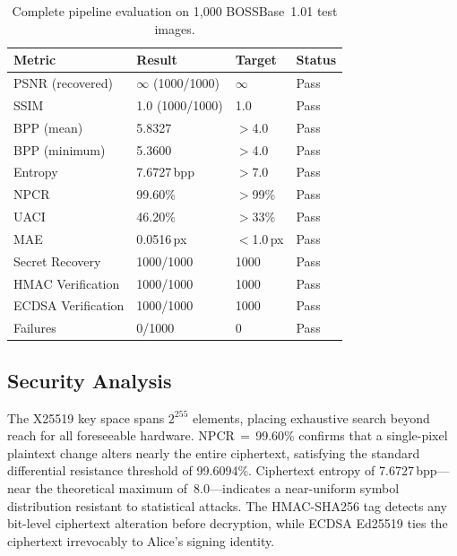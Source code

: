 \documentclass[runningheads]{llncs}
\begin{document}
\begin{table}[t]
\centering
\caption{Complete pipeline evaluation on 1,000 BOSSBase~1.01
test images.}
\label{tab:results}
\begin{tabular}{@{}llll@{}}
\toprule
\textbf{Metric} & \textbf{Result} & \textbf{Target} & \textbf{Status}\\
\midrule
PSNR (recovered)   & $\infty$ (1000/1000)  & $\infty$   & Pass\\
SSIM               & 1.0 (1000/1000)       & 1.0        & Pass\\
BPP (mean)         & 5.8327                & $>$4.0     & Pass\\
BPP (minimum)      & 5.3600                & $>$4.0     & Pass\\
Entropy            & 7.6727\,bpp           & $>$7.0     & Pass\\
NPCR               & 99.60\%               & $>$99\%    & Pass\\
UACI               & 46.20\%               & $>$33\%    & Pass\\
MAE                & 0.0516\,px            & $<$1.0\,px & Pass\\
Secret Recovery    & 1000/1000             & 1000       & Pass\\
HMAC Verification  & 1000/1000             & 1000       & Pass\\
ECDSA Verification & 1000/1000             & 1000       & Pass\\
Failures           & 0/1000                & 0          & Pass\\
\bottomrule
\end{tabular}
\end{table}

\subsection{Security Analysis}
The X25519 key space spans $2^{255}$ elements, placing
exhaustive search beyond reach for all foreseeable hardware.
NPCR\,$=$\,99.60\% confirms that a single-pixel plaintext
change alters nearly the entire ciphertext, satisfying the
standard differential resistance threshold of 99.6094\%.
Ciphertext entropy of 7.6727\,bpp---near the theoretical
maximum of~8.0---indicates a near-uniform symbol distribution
resistant to statistical attacks. The HMAC-SHA256 tag detects
any bit-level ciphertext alteration before decryption, while
ECDSA Ed25519 ties the ciphertext irrevocably to Alice's
signing identity.
\end{document}
